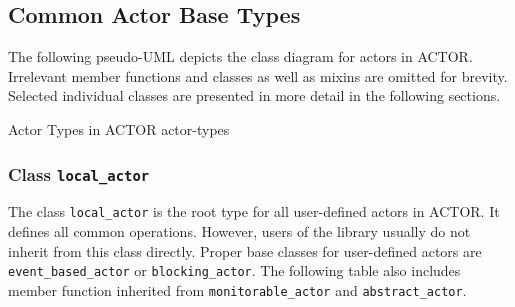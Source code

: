 \clearpage
\subsection{Common Actor Base Types}

The following pseudo-UML depicts the class diagram for actors in ACTOR.
Irrelevant member functions and classes as well as mixins are omitted for
brevity. Selected individual classes are presented in more detail in the
following sections.

%
          {Actor Types in ACTOR}%
          {actor-types}

\clearpage
\subsubsection{Class \lstinline^local_actor^}

The class \lstinline^local_actor^ is the root type for all user-defined actors
in ACTOR. It defines all common operations. However, users of the library
usually do not inherit from this class directly. Proper base classes for
user-defined actors are \lstinline^event_based_actor^ or
\lstinline^blocking_actor^. The following table also includes member function
inherited from \lstinline^monitorable_actor^ and \lstinline^abstract_actor^.


